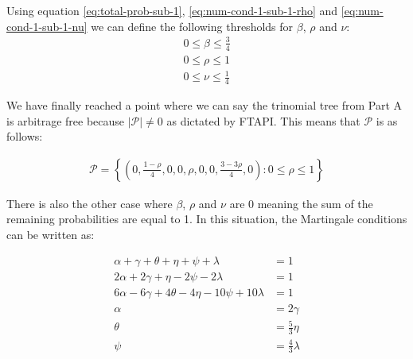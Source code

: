\documentclass{article}
\begin{document}
Using equation \ref{eq:total-prob-sub-1}, \ref{eq:num-cond-1-sub-1-rho} and \ref{eq:num-cond-1-sub-1-nu} we can define the following thresholds for $\beta$, $\rho$ and $\nu$:
\begin{align*}
    0 \leq \beta \leq \frac{3}{4} \\
    0 \leq \rho \leq 1 \\
    0 \leq \nu \leq \frac{1}{4}
\end{align*}

We have finally reached a point where we can say the trinomial tree from Part A is arbitrage free because $|\mathcal{P}|\neq0$ as dictated by FTAPI. This means that $\mathcal{P}$ is as follows:

\begin{align*}
    \mathcal{P} = \left\{ \left(0, \frac{1-\rho}{4}, 0, 0 , \rho, 0, 0, \frac{3-3\rho}{4}, 0\right): 0 \leq \rho \leq 1 \right\}
\end{align*}

There is also the other case where $\beta$, $\rho$ and $\nu$ are 0 meaning the sum of the remaining probabilities are equal to 1. In this situation, the Martingale conditions can be written as: 

\begin{align}
    \alpha+\gamma+\theta+\eta+\psi+\lambda & = 1 \label{eq:EMM-cond-1} \\
    2\alpha+2\gamma + \eta - 2\psi - 2\lambda & = 1 \label{eq:EMM-cond-2}\\
    6\alpha - 6\gamma + 4\theta -4\eta -10\psi + 10\lambda & = 1 \label{eq:EMM-cond-3}\\
    \alpha & = 2\gamma \label{eq:EMM-cond-4}\\
    \theta & = \frac{5}{3}\eta \label{eq:EMM-cond-5}\\
    \psi & = \frac{4}{3}\lambda \label{eq:EMM-cond-6}
\end{align}
\end{document}
